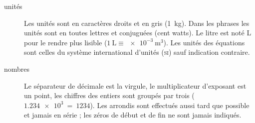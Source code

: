 \begin{description}
	\item[unités]		Les unités sont en caractères droits et en gris (\SI{1}{\kilogram}). Dans les phrases les unités sont en toutes lettres et conjuguées (cent \si{watts}). Le \si{litre} est noté \si{\liter} pour le rendre plus lisible ($\SI{1}{\liter} \equiv \SI{e-3}{\metre\cubed}$). Les unités des équations sont celles du système international d’unités (\textsc{si}) sauf indication contraire.
	\item[nombres]		Le séparateur de décimale est la virgule, le multiplicateur d’exposant est un point, les chiffres des entiers sont groupés par trois ($\SI{1,234e3} ~=~ \num{1234}$). Les arrondis sont effectués aussi tard que possible et jamais en série ; les zéros de début et de fin ne sont jamais indiqués.
\end{description}
